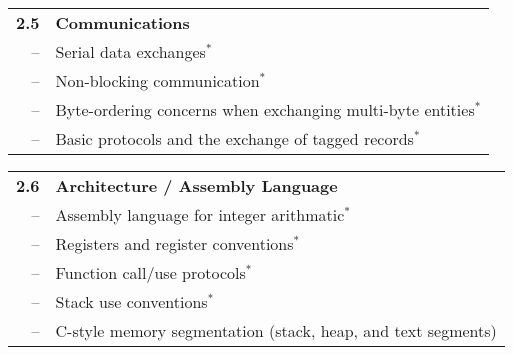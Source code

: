 \noindent
\begin{tabular}{r l}
{\bf 2.5} & {\bf Communications} \\
-- & Serial data exchanges$^*$ \\
-- & Non-blocking communication$^*$ \\
-- & Byte-ordering concerns when exchanging multi-byte entities$^*$ \\
-- & Basic protocols and the exchange of tagged records$^*$
\end{tabular}





\noindent
\begin{tabular}{r l}
{\bf 2.6} & {\bf Architecture / Assembly Language} \\
-- & Assembly language for integer arithmatic$^*$ \\
-- & Registers and register conventions$^*$ \\
-- & Function call/use protocols$^*$ \\
-- & Stack use conventions$^*$ \\
-- & C-style memory segmentation (stack, heap, and text segments)
\end{tabular}
